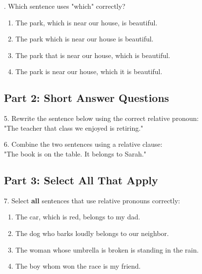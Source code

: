 \documentclass[12pt]{article}
\begin{document}
\vspace{1cm}
. Which sentence uses "which" correctly?\\
\begin{enumerate}[label=\Alph*.]
    \item The park, which is near our house, is beautiful.  
    \item The park which is near our house is beautiful.  
    \item The park that is near our house, which is beautiful.  
    \item The park is near our house, which it is beautiful.  
\end{enumerate}

\vspace{1cm}


\subsection*{Part 2: Short Answer Questions}

5. Rewrite the sentence below using the correct relative pronoun: \\
"The teacher that class we enjoyed is retiring."\\
\vspace{3cm}

6. Combine the two sentences using a relative clause: \\
"The book is on the table. It belongs to Sarah."\\
\vspace{3cm}
\newpage
\subsection*{Part 3: Select All That Apply}

7. Select \textbf{all} sentences that use relative pronouns correctly:\\
\begin{enumerate}[label=\Alph*.]
    \item The car, which is red, belongs to my dad.  
    \item The dog who barks loudly belongs to our neighbor.  
    \item The woman whose umbrella is broken is standing in the rain.  
    \item The boy whom won the race is my friend.  
\end{enumerate}

\vspace{1cm}
\end{document}
